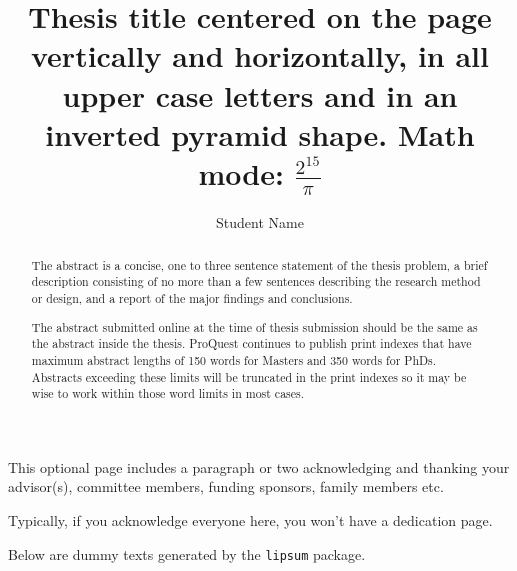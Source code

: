 \documentclass[12pt]{mines-thesis}
\begin{document}
\autotitle %
\title{Thesis title centered on the page vertically and horizontally, in all upper case letters and in an inverted pyramid shape. Math mode: $\frac{2^{15}}{\pi}$
}
%	
	
\author{Student Name}  %
	
	
\begin{abstract}
	The abstract is a concise, one to three sentence statement of the thesis problem, a brief description consisting of no more than a few sentences describing the research method or design, and a report of the major findings and conclusions.
			
	The abstract submitted online at the time of thesis submission should be the same as the abstract inside the thesis. ProQuest continues to publish print indexes that have maximum abstract lengths of 150 words for Masters and 350 words for PhDs. Abstracts exceeding these limits will be truncated in the print indexes so it may be wise to work within those word limits in most cases.
\end{abstract}

\begin{acknowledgment}
	This optional page includes a paragraph or two acknowledging and thanking your
	advisor(s), committee members, funding sponsors, family members etc.
			
	Typically, if you acknowledge everyone here, you won’t have a dedication page.
	
	Below are dummy texts generated  by the \texttt{lipsum} package.
	\lipsum[3]
\end{acknowledgment}
\end{document}
